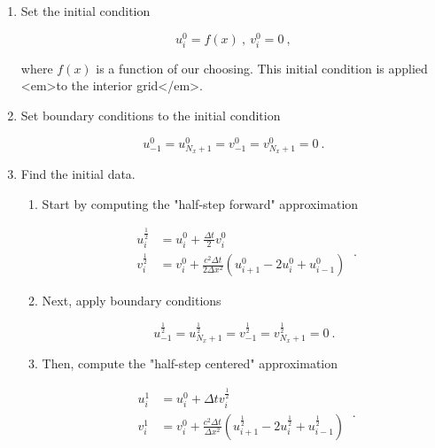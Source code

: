 \documentclass[a4paper,11pt]{article}
\begin{document}
\begin{enumerate}
\item Set the initial condition

\begin{equation}
\boxed{u^{0}_{i} = f(x)\ ,\ v^{0}_{i} = 0 }\ ,
\end{equation}

where $f(x)$ is a function of our choosing. This initial condition is applied <em>to the interior grid</em>.

\item Set boundary conditions to the initial condition

\begin{equation}
\boxed{u^{0}_{-1} = u^{0}_{N_{x}+1} = v^{0}_{-1} = v^{0}_{N_{x}+1} = 0}\ .
\end{equation}

\item Find the initial data.

  \begin{enumerate}

    \item Start by computing the "half-step forward" approximation

\begin{equation}
\boxed{
\begin{aligned}
u^{\frac{1}{2}}_{i} &= u^{0}_{i} + \frac{\Delta t}{2}v^{0}_{i}\\
v^{\frac{1}{2}}_{i} &= v^{0}_{i} + \frac{c^{2}\Delta t}{2\Delta x^{2}}\left(u^{0}_{i+1}-2u^{0}_{i}+u^{0}_{i-1}\right)
\end{aligned}
}\ .
\end{equation}

    \item Next, apply boundary conditions

\begin{equation}
\boxed{u^{\frac{1}{2}}_{-1} = u^{\frac{1}{2}}_{N_{x}+1} = v^{\frac{1}{2}}_{-1} = v^{\frac{1}{2}}_{N_{x}+1} = 0}\ .
\end{equation}

    \item Then, compute the "half-step centered" approximation

\begin{equation}
\boxed{
\begin{aligned}
u^{1}_{i} &= u^{0}_{i} + \Delta t v^{\frac{1}{2}}_{i}\\
v^{1}_{i} &= v^{0}_{i} + \frac{c^{2}\Delta t}{\Delta x^{2}}\left(u^{\frac{1}{2}}_{i+1}-2u^{\frac{1}{2}}_{i}+u^{\frac{1}{2}}_{i-1}\right)
\end{aligned}
}\ .
\end{equation}


\end{enumerate}
\end{enumerate}
\end{document}
